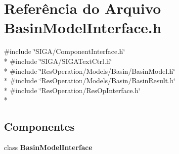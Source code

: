 \section{Referência do Arquivo Basin\+Model\+Interface.\+h}
\label{_basin_model_interface_8h}
{\ttfamily \#include \char`\"{}S\+I\+G\+A/\+Component\+Interface.\+h\char`\"{}}\\*
{\ttfamily \#include \char`\"{}S\+I\+G\+A/\+S\+I\+G\+A\+Text\+Ctrl.\+h\char`\"{}}\\*
{\ttfamily \#include \char`\"{}Res\+Operation/\+Models/\+Basin/\+Basin\+Model.\+h\char`\"{}}\\*
{\ttfamily \#include \char`\"{}Res\+Operation/\+Models/\+Basin/\+Basin\+Result.\+h\char`\"{}}\\*
{\ttfamily \#include \char`\"{}Res\+Operation/\+Res\+Op\+Interface.\+h\char`\"{}}\\*
\subsection*{Componentes}
\begin{DoxyCompactItemize}
\item 
class {\bf Basin\+Model\+Interface}
\end{DoxyCompactItemize}
